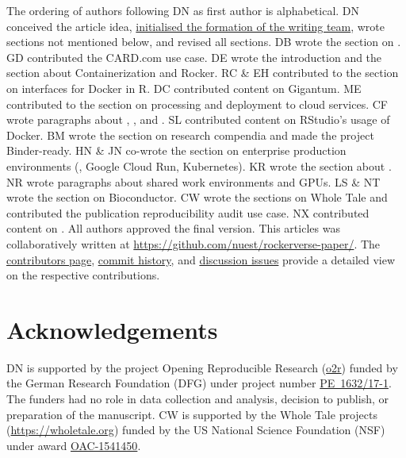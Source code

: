 The ordering of authors following DN as first author is alphabetical. DN
conceived the article idea,
\href{https://github.com/nuest/rockerverse-paper/issues/3}{initialised the formation of the writing team},
wrote sections not mentioned below, and revised all sections. DB wrote
the section on . GD contributed the CARD.com use case. DE
wrote the introduction and the section about Containerization and
Rocker. RC \& EH contributed to the section on interfaces for Docker in
R. DC contributed content on Gigantum. ME contributed to the section on
processing and deployment to cloud services. CF wrote paragraphs about
, ,  and . SL
contributed content on RStudio's usage of Docker. BM wrote the section
on research compendia and made the project Binder-ready. HN \& JN
co-wrote the section on enterprise production environments
(, Google Cloud Run, Kubernetes). KR wrote the
section about . NR wrote paragraphs about shared work
environments and GPUs. LS \& NT wrote the section on Bioconductor. CW
wrote the sections on Whole Tale and contributed the publication
reproducibility audit use case. NX contributed content on .
All authors approved the final version. This articles was
collaboratively written at
\href{https://github.com/nuest/rockerverse-paper/}{https://github.com/nuest/rockerverse-paper/}.
The
\href{https://github.com/nuest/rockerverse-paper/graphs/contributors}{contributors page},
\href{https://github.com/nuest/rockerverse-paper/commits/master}{commit history},
and
\href{https://github.com/nuest/rockerverse-paper/issues/}{discussion issues}
provide a detailed view on the respective contributions.

\hypertarget{acknowledgements}{%
\section{Acknowledgements}\label{acknowledgements}}

DN is supported by the project Opening Reproducible Research
(\href{https://www.uni-muenster.de/forschungaz/project/12343}{o2r})
funded by the German Research Foundation (DFG) under project number
\href{https://gepris.dfg.de/gepris/projekt/415851837}{PE~1632/17-1}. The
funders had no role in data collection and analysis, decision to
publish, or preparation of the manuscript. CW is supported by the Whole
Tale projects (\url{https://wholetale.org}) funded by the US National
Science Foundation (NSF) under award
\href{https://www.nsf.gov/awardsearch/showAward?AWD_ID=1541450}{OAC-1541450}.

